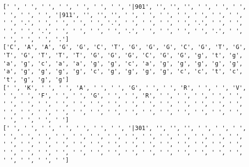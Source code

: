 \documentclass{article}
\begin{document}
\begin{Verbatim}
[' ', ' ', ' ', ' ', ' ', ' ', ' ', '|901', '', '', '', ' ', ' ', ' ', ' ', ' ', ' ', '|911', '', '', '', ' ', ' ', ' ', ' ', ' ', ' ', ' ', ' ', '.', ' ', ' ', ' ', ' ', '.', ' ', ' ', ' ', ' ', '.', ' ', ' ', ' ', ' ', '.', ' ', ' ', ' ', ' ', '.', ' ', ' ', ' ', ' ', '.', ' ', ' ', ' ', ' ', '.']
['C', 'A', 'A', 'G', 'G', 'C', 'T', 'G', 'G', 'G', 'C', 'G', 'T', 'G', 'T', 'G', 'T', 'T', 'T', 'G', 'G', 'G', 'C', 'G', 'G', 'g', 't', 'g', 'a', 'g', 'c', 'a', 'a', 'g', 'g', 'c', 'a', 'g', 'g', 'g', 'g', 'g', 'a', 'g', 'g', 'g', 'g', 'c', 'g', 'g', 'g', 'g', 'c', 'c', 't', 'c', 't', 'g', 'g', 'g']
[' ', 'K', ' ', ' ', 'A', ' ', ' ', 'G', ' ', ' ', 'R', ' ', ' ', 'V', ' ', ' ', 'F', ' ', ' ', 'G', ' ', ' ', 'R', ' ', ' ', ' ', ' ', ' ', ' ', ' ', ' ', ' ', ' ', ' ', ' ', ' ', ' ', ' ', ' ', ' ', ' ', ' ', ' ', ' ', ' ', ' ', ' ', ' ', ' ', ' ', ' ', ' ', ' ', ' ', ' ', ' ', ' ', ' ', ' ', ' ']
[' ', ' ', ' ', ' ', ' ', ' ', ' ', '|301', '', '', '', ' ', ' ', ' ', ' ', ' ', ' ', ' ', ' ', ' ', ' ', ' ', ' ', ' ', ' ', ' ', ' ', ' ', ' ', ' ', ' ', ' ', ' ', ' ', ' ', ' ', ' ', ' ', ' ', ' ', ' ', ' ', ' ', ' ', ' ', ' ', ' ', ' ', ' ', ' ', ' ', ' ', ' ', ' ', ' ', ' ', ' ', ' ', ' ', ' ']
  

\end{Verbatim}
\end{document}
